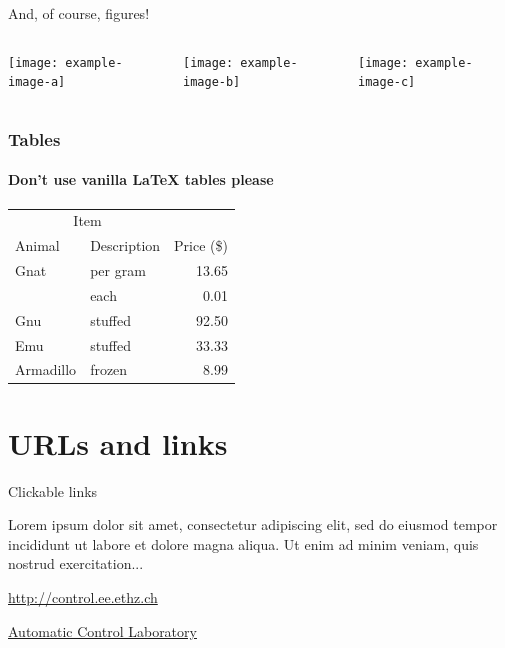 \begin{frame}{And, of course, figures!}

	\begin{columns}
		\begin{column}{0.33\textwidth}
			\texttt{[image: example-image-a]}
		\end{column}
		\begin{column}{0.33\textwidth}
			\texttt{[image: example-image-b]}
		\end{column}
		\begin{column}{0.33\textwidth}
			\texttt{[image: example-image-c]}
		\end{column}
	\end{columns}

\end{frame}

\begin{frame}

	\frametitle{Tables}
	\framesubtitle{Don't use vanilla \LaTeX{}  tables please}
	
		\begin{center}
			\begin{tabular}{@{}llr@{}}
				\toprule\multicolumn{2}{c}{Item} \\
				\cmidrule(r){1-2}Animal & Description & Price (\$)\\
				\midrule
				Gnat  & per gram  & 13.65 \\
				& each      & 0.01 \\
				Gnu   & stuffed   & 92.50 \\
				Emu   & stuffed   & 33.33 \\
				Armadillo & frozen & 8.99 \\
				\bottomrule
			\end{tabular}
		\end{center}

\end{frame}

\section{URLs and links}

\begin{frame}{Clickable links}

	Lorem ipsum dolor sit amet, consectetur adipiscing elit, sed do eiusmod tempor incididunt ut labore et dolore magna aliqua. 
	Ut enim ad minim veniam, quis nostrud exercitation...
	
	\medskip

	\url{http://control.ee.ethz.ch}
	
	\href{http://control.ee.ethz.ch}{Automatic Control Laboratory}
	

\end{frame}

